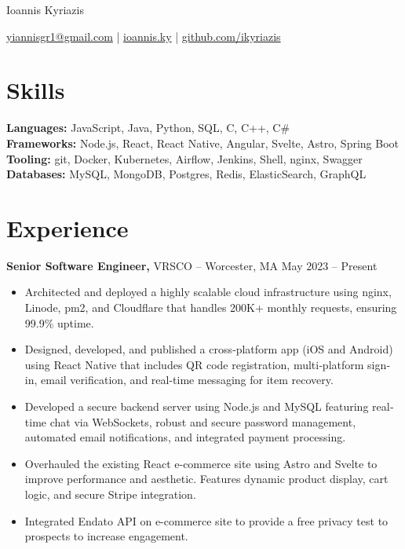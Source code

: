 \documentclass[11pt]{article}       %
\begin{document}
\centerline{\Huge Ioannis Kyriazis}

\vspace{5pt}

\centerline{\href{mailto:yiannisgr1@gmail.com}{yiannisgr1@gmail.com} | \href{https://ioannis.ky}{ioannis.ky} | \href{https://github.com/ikyriazis}{github.com/ikyriazis}}

\vspace{-10pt}

\section*{Skills}
\textbf{Languages:} JavaScript, Java, Python, SQL, C, C++, C\# \\
\textbf{Frameworks:} Node.js, React, React Native, Angular, Svelte, Astro, Spring Boot \\
\textbf{Tooling:} git, Docker, Kubernetes, Airflow, Jenkins, Shell, nginx, Swagger \\
\textbf{Databases:} MySQL, MongoDB, Postgres, Redis, ElasticSearch, GraphQL


\vspace{-6.5pt}

\section*{Experience}
\textbf{Senior Software Engineer,} {VRSCO} -- Worcester, MA \hfill May 2023 -- Present \\
\vspace{-9pt}
\begin{itemize}
  \item Architected and deployed a highly scalable cloud infrastructure using nginx, Linode, pm2, and Cloudflare that handles 200K+ monthly requests, ensuring 99.9\% uptime.
  \item Designed, developed, and published a cross‐platform app (iOS and Android) using React Native that includes QR code registration, multi‐platform sign‐in, email verification, and real-time messaging for item recovery.
  \item Developed a secure backend server using Node.js and MySQL featuring real‐time chat via WebSockets, robust and secure password management, automated email notifications, and integrated payment processing.
  \item Overhauled the existing React e-commerce site using Astro and Svelte to improve performance and aesthetic. Features dynamic product display, cart logic, and secure Stripe integration.
  \item Integrated Endato API on e-commerce site to provide a free privacy test to prospects to increase engagement.
\end{itemize}
\end{document}
